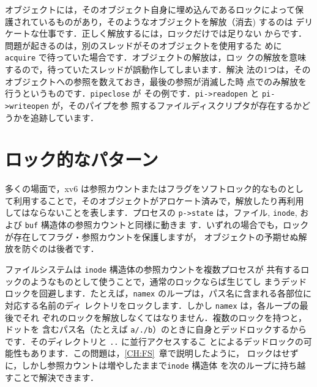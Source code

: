 オブジェクトには，そのオブジェクト自身に埋め込んであるロックによって保
護されているものがあり，そのようなオブジェクトを解放（消去) するのは
デリケートな仕事です．正しく解放するには，ロックだけでは足りない
からです．問題が起きるのは，別のスレッドがそのオブジェクトを使用するた
めに \texttt{acquire} で待っていた場合です．オブジェクトの解放は，ロッ
クの解放を意味するので，待っていたスレッドが誤動作してしまいます．解決
法の1つは，そのオブジェクトへの参照を数えておき，最後の参照が消滅した時
点でのみ解放を行うというものです．\texttt{pipeclose}  が
その例です．\texttt{pi->readopen} と \texttt{pi->writeopen} が，そのパイプを参
照するファイルディスクリプタが存在するかどうかを追跡しています．


\section{ロック的なパターン}

多くの場面で，xv6 は参照カウントまたはフラグをソフトロック的なものとし
て利用することで，そのオブジェクトがアロケート済みで，解放したり再利用
してはならないことを表します．プロセスの \texttt{p->state} は，ファイル,
\texttt{inode}, および \texttt{buf} 構造体の参照カウントと同様に動きま
す．いずれの場合でも，ロックが存在してフラグ・参照カウントを保護しますが，
オブジェクトの予期せぬ解放を防ぐのは後者です．

ファイルシステムは \texttt{inode} 構造体の参照カウントを複数プロセスが
共有するロックのようなものとして使うことで，通常のロックならば生じてし
まうデッドロックを回避します．たとえば，\texttt{namex}
 のループは，パス名に含まれる各部位に対応する名前のディ
レクトリをロックします．しかし \texttt{namex} は，各ループの最後でそれ
ぞれのロックを解放しなくてはなりません．複数のロックを持つと，ドットを
含むパス名（たとえば \texttt{a/./b}）のときに自身とデッドロックするから
です．そのディレクトリと \texttt{..} に並行アクセスするこ
とによるデッドロックの可能性もあります．この問題は，\ref{CH:FS}~章で説明したように，
ロックはせずに，しかし参照カウントは増やしたままで\texttt{inode} 構造体
を次のループに持ち越すことで解決できます．

